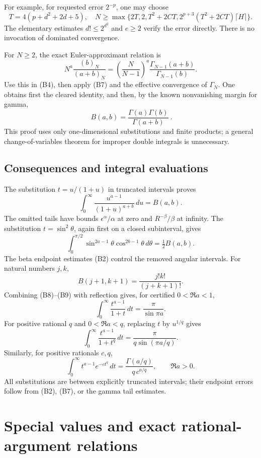 For example, for requested error \(2^{-p}\), one may choose
\[
 T=4(p+d^2+2d+5),\quad
 N\ge\max\{2T,2,T^2+2CT,
       2^{p+3}(T^2+2CT)\lceil H\rceil\}.
\]
The elementary estimates \(d!\le2^{d^2}\) and \(e\ge2\) verify the
error directly. There is no invocation of dominated convergence.

For \(N\ge2\), the exact Euler-approximant relation is
\[
 N^a\frac{(b)_N}{(a+b)_N}
   =\left(\frac N{N-1}\right)^a
                 \frac{\Gamma_{N-1}(a+b)}{\Gamma_{N-1}(b)}.
\]
Use this in (B4), then apply (B7) and the effective convergence of
\(\Gamma_N\). One obtains first the cleared identity, and then, by the
known nonvanishing margin for gamma,
\[
 \boxed{\ B(a,b)=\frac{\Gamma(a)\Gamma(b)}{\Gamma(a+b)}\ }.          \tag{B8}
\]
This proof uses only one-dimensional substitutions and finite products;
a general change-of-variables theorem for improper double integrals is
unnecessary.

\subsection{Consequences and integral evaluations}

The substitution \(t=u/(1+u)\) in truncated intervals proves
\[
 \int_0^\infty\frac{u^{a-1}}{(1+u)^{a+b}}\,du=B(a,b). \tag{B9}
\]
The omitted tails have bounds \(\epsilon^\alpha/\alpha\) at zero and
\(R^{-\beta}/\beta\) at infinity. The substitution
\(t=\sin^2\theta\), again first on a closed subinterval, gives
\[
 \int_0^{\pi/2}\sin^{2a-1}\theta\cos^{2b-1}\theta\,d\theta
                     =\tfrac12 B(a,b).                \tag{B10}
\]
The beta endpoint estimates (B2) control the removed angular intervals.
For natural numbers \(j,k\),
\[
 B(j+1,k+1)=\frac{j!k!}{(j+k+1)!}.                      \tag{B11}
\]
Combining (B8)--(B9) with reflection gives, for certified
\(0<\Re a<1\),
\[
 \int_0^\infty\frac{t^{a-1}}{1+t}\,dt
       =\frac\pi{\sin\pi a}.                          \tag{B12}
\]
For positive rational \(q\) and \(0<\Re a<q\), replacing \(t\) by
\(u^{1/q}\) gives
\[
 \int_0^\infty\frac{t^{a-1}}{1+t^q}\,dt
       =\frac\pi{q\sin(\pi a/q)}.                     \tag{B13}
\]
Similarly, for positive rationals \(c,q\),
\[
 \int_0^\infty t^{a-1}e^{-ct^q}\,dt
       =\frac{\Gamma(a/q)}{q\,c^{a/q}},\qquad \Re a>0. \tag{B14}
\]
All substitutions are between explicitly truncated intervals; their
endpoint errors follow from (B2), (B7), or the gamma tail estimates.

\section{Special values and exact rational-argument relations}


